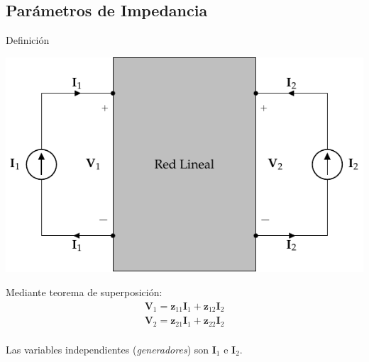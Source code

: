 \documentclass[xcolor={usenames,svgnames,dvipsnames}]{beamer}
\begin{document}
\subsection{Parámetros de Impedancia}
\label{sec:org39850c0}

\begin{frame}[label={sec:org4a5c1ec}]{Definición}
\begin{center}
\includegraphics[width=.9\linewidth]{figs/cuadripolo_fuentes_corriente.pdf}
\end{center}

Mediante teorema de superposición:
\[
\begin{array}{l}
  \mathbf{V}_1 = \mathbf{z}_{11} \mathbf{I}_1 + \mathbf{z}_{12} \mathbf{I}_2\\
  \mathbf{V}_2 = \mathbf{z}_{21} \mathbf{I}_1 + \mathbf{z}_{22} \mathbf{I}_2\\
\end{array}
\]

Las variables independientes (\emph{generadores}) son \(\mathbf{I}_1\) e \(\mathbf{I}_2\).
\end{frame}
\end{document}
